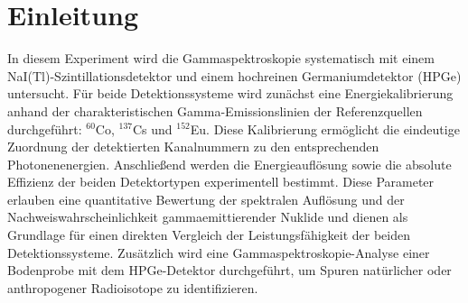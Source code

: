 \chapter{Einleitung}
In diesem Experiment wird die Gammaspektroskopie systematisch mit einem NaI(Tl)-Szintillationsdetektor und einem hochreinen Germaniumdetektor (HPGe) untersucht. Für beide Detektionssysteme wird zunächst eine Energiekalibrierung anhand der charakteristischen Gamma-Emissionslinien der Referenzquellen durchgeführt:
$^{60}$Co, $^{137}$Cs und $^{152}$Eu. Diese Kalibrierung ermöglicht die eindeutige Zuordnung der detektierten Kanalnummern zu den entsprechenden Photonenenergien.
Anschließend werden die Energieauflösung sowie die absolute  Effizienz der beiden Detektortypen experimentell bestimmt. Diese Parameter erlauben eine quantitative Bewertung der spektralen Auflösung und der Nachweiswahrscheinlichkeit gammaemittierender Nuklide und dienen als Grundlage für einen direkten Vergleich der Leistungsfähigkeit der beiden Detektionssysteme.
Zusätzlich wird eine Gammaspektroskopie-Analyse einer Bodenprobe mit dem HPGe-Detektor durchgeführt, um Spuren natürlicher oder anthropogener Radioisotope zu identifizieren.